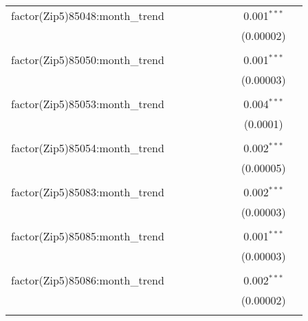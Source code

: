 \begin{table}[H]
{\begin{tabular}{@{\extracolsep{5pt}}lcccccccc}
  factor(Zip5)85048:month\_trend &  &  &  &  &  &  & 0.001$^{***}$ &  \\  

   &  &  &  &  &  &  & (0.00002) &  \\  

   & & & & & & & & \\  

  factor(Zip5)85050:month\_trend &  &  &  &  &  &  & 0.001$^{***}$ &  \\  

   &  &  &  &  &  &  & (0.00003) &  \\  

   & & & & & & & & \\  

  factor(Zip5)85053:month\_trend &  &  &  &  &  &  & 0.004$^{***}$ &  \\  

   &  &  &  &  &  &  & (0.0001) &  \\  

   & & & & & & & & \\  

  factor(Zip5)85054:month\_trend &  &  &  &  &  &  & 0.002$^{***}$ &  \\  

   &  &  &  &  &  &  & (0.00005) &  \\  

   & & & & & & & & \\  

  factor(Zip5)85083:month\_trend &  &  &  &  &  &  & 0.002$^{***}$ &  \\  

   &  &  &  &  &  &  & (0.00003) &  \\  

   & & & & & & & & \\  

  factor(Zip5)85085:month\_trend &  &  &  &  &  &  & 0.001$^{***}$ &  \\  

   &  &  &  &  &  &  & (0.00003) &  \\  

   & & & & & & & & \\  

  factor(Zip5)85086:month\_trend &  &  &  &  &  &  & 0.002$^{***}$ &  \\  

   &  &  &  &  &  &  & (0.00002) &  \\  

   & & & & & & & & \\  


\end{tabular}}
\end{table}
